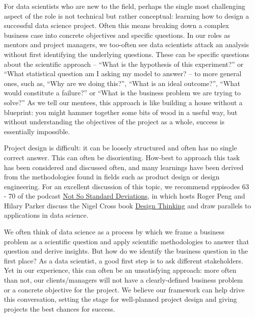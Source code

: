 \documentclass[
]{book}
\begin{document}
For data scientists who are new to the field, perhaps the single most challenging aspect of the role is not technical but rather conceptual: learning how to design a successful data science project. Often this means breaking down a complex business case into concrete objectives and specific questions. In our roles as mentors and project managers, we too-often see data scientists attack an analysis without first identifying the underlying questions. These can be specific questions about the scientific approach -- ``What is the hypothesis of this experiment?'' or ``What statistical question am I asking my model to answer? -- to more general ones, such as, ``Why are we doing this?'', ``What is an ideal outcome?'', ``What would constitute a failure?'' or ``What is the business problem we are trying to solve?'' As we tell our mentees, this approach is like building a house without a blueprint: you might hammer together some bits of wood in a useful way, but without understanding the objectives of the project as a whole, success is essentially impossible.

Project design is difficult: it can be loosely structured and often has no single correct answer. This can often be disorienting. How-best to approach this task has been considered and discussed often, and many learnings have been derived from the methodologies found in fields such as product design or design engineering. For an excellent discussion of this topic, we recommend eppisodes 63 - 70 of the podcast \href{http://nssdeviations.com/}{Not So Standard Deviations}, in which hosts Roger Peng and Hilary Parker discuss the Nigel Cross book \href{https://www.amazon.co.uk/Design-Thinking-Understanding-Designers-Blac14/dp/1847886361/ref=sr_1_2?keywords=Nigel+Cross+book+Design+Thinking\&qid=1576333690\&sr=8-2}{Design Thinking} and draw parallels to applications in data science.

We often think of data science as a process by which we frame a business problem as a scientific question and apply scientific methodologies to answer that question and derive insights. But how do we identify the business question in the first place? As a data scientist, a good first step is to ask different stakeholders. Yet in our experience, this can often be an unsatisfying approach: more often than not, our clients/managers will not have a clearly-defined business problem or a concrete objective for the project. We believe our framework can help drive this conversation, setting the stage for well-planned project design and giving projects the best chances for success.
\end{document}
